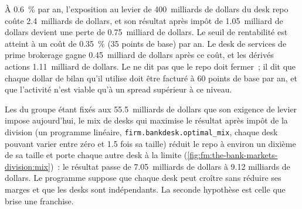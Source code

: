À 0.6~\% par an, l'exposition au levier de 400~milliards de dollars du desk repo coûte 2.4~milliards de dollars, et son résultat après impôt de 1.05~milliard de dollars devient une perte de
0.75~milliard de dollars. Le seuil de rentabilité est atteint à un coût de 0.35~\% (35 points de base) par an. Le desk de services de prime brokerage gagne 0.45~milliard de dollars après ce coût, et les
dérivés actions 1.11~milliard de dollars. Le  ne dit pas que le repo doit fermer~; il dit que chaque dollar de bilan qu'il utilise doit être
facturé à 60 points de base par an, et que l'activité n'est viable qu'à un spread supérieur à ce niveau.

\label{lst:fm:the-bank-markets-division:bankdesk}

Les  du groupe étant fixés aux 55.5~milliards de dollars que son exigence de levier impose aujourd'hui, le mix de desks qui maximise le résultat après impôt de la division
(un programme linéaire, \texttt{firm.bankdesk.optimal\_mix}, chaque desk pouvant varier entre zéro et 1.5 fois sa taille) réduit le repo à environ un
dixième de sa taille et porte chaque autre desk à la limite (\cref{fig:fm:the-bank-markets-division:mix})~: le résultat passe de 7.05~milliards de dollars à 9.12
milliards de dollars. Le programme suppose que chaque desk peut croître sans réduire ses marges et que les desks sont indépendants. La seconde hypothèse est celle
que brise une franchise.

